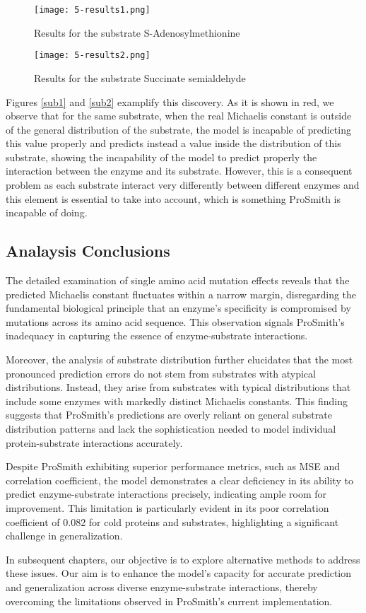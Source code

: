 \begin{figure}
    \centering
    \texttt{[image: 5-results1.png]}
    \caption{Results for the substrate S-Adenosylmethionine}
    \label{fig:sub1}
  \end{figure}

\begin{figure}
    \centering
    \texttt{[image: 5-results2.png]}
    \caption{Results for the substrate Succinate semialdehyde}
    \label{fig:sub2}
  \end{figure}

Figures \ref{sub1} and \ref{sub2} examplify this discovery. As it is shown in red, we observe that for the same substrate, when the real Michaelis constant is outside of the general distribution of the substrate, the model is incapable of predicting this value properly and predicts instead a value inside the distribution of this substrate, showing the incapability of the model to predict properly the interaction between the enzyme and its substrate. However, this is a consequent problem as each substrate interact very differently between different enzymes and this element is essential to take into account, which is something ProSmith is incapable of doing.

\subsection{Analaysis Conclusions}

The detailed examination of single amino acid mutation effects reveals that the predicted Michaelis constant fluctuates within a narrow margin, disregarding the fundamental biological principle that an enzyme's specificity is compromised by mutations across its amino acid sequence. This observation signals ProSmith's inadequacy in capturing the essence of enzyme-substrate interactions.

Moreover, the analysis of substrate distribution further elucidates that the most pronounced prediction errors do not stem from substrates with atypical distributions. Instead, they arise from substrates with typical distributions that include some enzymes with markedly distinct Michaelis constants. This finding suggests that ProSmith's predictions are overly reliant on general substrate distribution patterns and lack the sophistication needed to model individual protein-substrate interactions accurately.

Despite ProSmith exhibiting superior performance metrics, such as MSE and correlation coefficient, the model demonstrates a clear deficiency in its ability to predict enzyme-substrate interactions precisely, indicating ample room for improvement. This limitation is particularly evident in its poor correlation coefficient of 0.082 for cold proteins and substrates, highlighting a significant challenge in generalization.

In subsequent chapters, our objective is to explore alternative methods to address these issues. Our aim is to enhance the model's capacity for accurate prediction and generalization across diverse enzyme-substrate interactions, thereby overcoming the limitations observed in ProSmith's current implementation.
